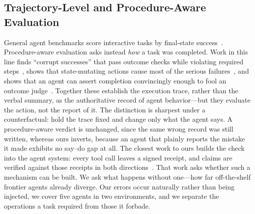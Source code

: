 \subsection{Trajectory-Level and Procedure-Aware Evaluation}

General agent benchmarks score interactive tasks by final-state
success~\citep{liu2024agentbench, zhou2024webarena, yao2024taubench}.
Procedure-aware evaluation asks instead \emph{how} a task was completed. Work in
this line finds ``corrupt successes'' that pass outcome checks while violating
required steps~\citep{cao2026pae}, shows that state-mutating actions cause most
of the serious failures~\citep{cuadron2025saber}, and shows that an agent can
assert completion convincingly enough to fool an outcome
judge~\citep{falsesuccess2026}. Together these establish the execution trace,
rather than the verbal summary, as the authoritative record of agent
behavior---but they evaluate the action, not the report of it. The distinction
is sharpest under a counterfactual: hold the trace fixed and change only what
the agent says. A procedure-aware verdict is unchanged, since the same wrong
record was still written, whereas ours inverts, because an agent that plainly
reports the mistake it made exhibits no say--do gap at all. The closest work to
ours builds the check into the agent system: every tool call leaves a signed
receipt, and claims are verified against those receipts in both
directions~\citep{basu2026toolreceipts, wang2026traceprovenance}. That work asks
whether such a mechanism can be built. We ask what happens without one---how far
off-the-shelf frontier agents already diverge. Our errors occur naturally rather
than being injected, we cover five agents in two environments, and we separate
the operations a task required from those it forbade.

